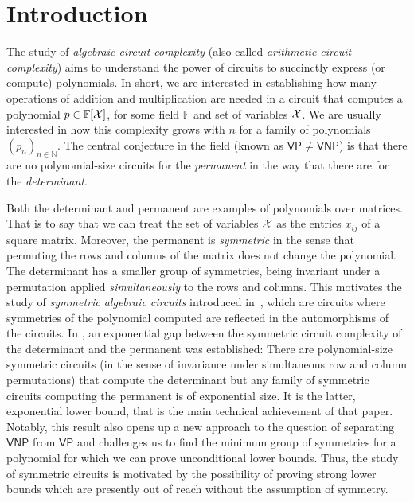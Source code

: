 \documentclass[10pt,a4paper]{article}
\theoremstyle{definition}
\theoremstyle{plain}
\theoremstyle{remark}
\newcommand{\Xx}{{\cal X}}
\newcommand{\bbN}{\mathbb{N}}
\newcommand{\bbF}{\mathbb{F}}
\newcommand{\VP}{\mathsf{VP}}
\newcommand{\VNP}{\mathsf{VNP}}
\begin{document}
\section{Introduction}	
The study of \emph{algebraic circuit complexity} (also called \emph{arithmetic circuit complexity}) aims to understand the power of circuits to succinctly express (or compute) polynomials.  In short, we are interested in establishing how many operations of addition and multiplication are needed in a circuit that computes a polynomial $p \in \bbF[\Xx]$, for some field $\bbF$ and set of variables $\Xx$.  We are usually interested in how this complexity grows with $n$ for a family of polynomials $(p_n)_{n \in \bbN}$.  The central conjecture in the field (known as $\VP \neq \VNP$) is that there are no polynomial-size circuits for the \emph{permanent} in the way that there are for the \emph{determinant}.

Both the determinant and permanent are examples of polynomials over matrices.  That is to say that we can treat the set of variables $\Xx$ as the entries $x_{ij}$ of a square matrix.  Moreover, the permanent is \emph{symmetric} in the sense that permuting the rows and columns of the matrix does not change the polynomial.  The determinant has a smaller group of symmetries, being invariant under a permutation applied \emph{simultaneously} to the rows and columns.  This motivates the study of \emph{symmetric algebraic circuits} introduced in~\cite{dawar_symmetric_2020,dawar_symmetric_2025}, which are circuits where symmetries of the polynomial computed are reflected in the automorphisms of the circuits.  
In \cite{dawar_symmetric_2020,dawar_symmetric_2025}, an exponential gap between the symmetric circuit complexity of the determinant and the permanent was established:
There are polynomial-size symmetric circuits (in the sense of
invariance under simultaneous row and column permutations) that
compute the determinant but any family of symmetric circuits computing
the permanent is of exponential size.  It is the latter, exponential
lower bound, that is the main technical achievement of that
paper. Notably, this result also opens up a new approach to the
question of separating $\VNP$ from $\VP$ and challenges us to find the minimum group of symmetries for a polynomial for which we can prove unconditional lower bounds.
Thus, the study of symmetric circuits is motivated by the possibility of proving strong lower bounds which are presently out of reach without the assumption of symmetry.
\end{document}

